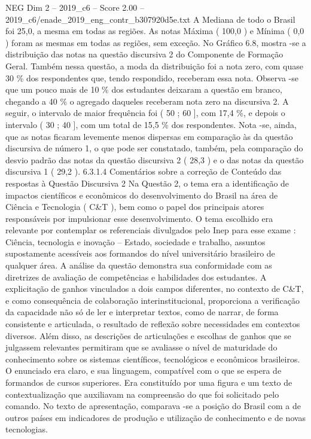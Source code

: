 \begin{textsample}{NEG Dim 2 – 2019\_c6 – Score 2.00 – 2019\_c6/enade\_2019\_eng\_contr\_b307920d5e.txt}
A Mediana de todo o Brasil foi 25,0, a mesma em todas as regiões.
As notas Máxima ( 100,0 ) e Mínima ( 0,0 ) foram as mesmas em todas as regiões, sem exceção.
No Gráfico 6.8, mostra -se a distribuição das notas na questão discursiva 2 do Componente de Formação Geral.
Também nessa questão, a moda da distribuição foi a nota zero, com quase 30 \% dos respondentes que, tendo respondido, receberam essa nota.
Observa -se que um pouco mais de 10 \% dos estudantes deixaram a questão em branco, chegando a 40 \% o agregado daqueles receberam nota zero na discursiva 2.
A seguir, o intervalo de maior frequência foi ( 50 ; 60 ], com 17,4 \%, e depois o intervalo ( 30 ; 40 ], com um total de 15,5 \% dos respondentes.
Nota -se, ainda, que as notas ficaram levemente menos dispersas em comparação às da questão discursiva de número 1, o que pode ser constatado, também, pela comparação do desvio padrão das notas da questão discursiva 2 ( 28,3 ) e o das notas da questão discursiva 1 ( 29,2 ). 6.3.1.4 Comentários sobre a correção de Conteúdo das respostas à Questão Discursiva 2 Na Questão 2, o tema era a identificação de impactos científicos e econômicos do desenvolvimento do Brasil na área de Ciência e Tecnologia ( C\&T ), bem como o papel dos principais atores responsáveis por impulsionar esse desenvolvimento.
O tema escolhido era relevante por contemplar os referenciais divulgados pelo Inep para esse exame : Ciência, tecnologia e inovação – Estado, sociedade e trabalho, assuntos supostamente acessíveis aos formandos do nível universitário brasileiro de qualquer área.
A análise da questão demonstra sua conformidade com as diretrizes de avaliação de competências e habilidades dos estudantes.
A explicitação de ganhos vinculados a dois campos diferentes, no contexto de C\&T, e como consequência de colaboração interinstitucional, proporciona a verificação da capacidade não só de ler e interpretar textos, como de narrar, de forma consistente e articulada, o resultado de reflexão sobre necessidades em contextos diversos.
Além disso, as descrições de articulações e escolhas de ganhos que se julgassem relevantes permitiram que se avaliasse o nível de maturidade do conhecimento sobre os sistemas científicos, tecnológicos e econômicos brasileiros.
O enunciado era claro, e sua linguagem, compatível com o que se espera de formandos de cursos superiores.
Era constituído por uma figura e um texto de contextualização que auxiliavam na compreensão do que foi solicitado pelo comando.
No texto de apresentação, comparava -se a posição do Brasil com a de outros países em indicadores de produção e utilização de conhecimento e de novas tecnologias.

\end{textsample}
